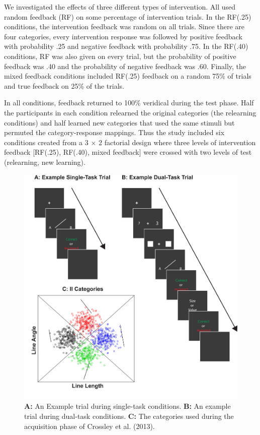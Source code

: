 \documentclass[apacite,draftfirst,man]{apa6}
\begin{document}
We investigated the effects of three different types of intervention. All used
random feedback (RF) on some percentage of intervention trials. In the RF(.25)
conditions, the intervention feedback was random on all trials. Since there are
four categories, every intervention response was followed by positive feedback
with probability .25 and negative feedback with probability .75. In the RF(.40)
conditions, RF was also given on every trial, but the probability of positive
feedback was .40 and the probability of negative feedback was .60. Finally, the
mixed feedback conditions included RF(.25) feedback on a random 75\% of trials
and true feedback on 25\% of the trials.

In all conditions, feedback returned to 100\% veridical during the test phase.
Half the participants in each condition relearned the original categories (the
relearning conditions) and half learned new categories that used the same
stimuli but permuted the category-response mappings. Thus the study included six
conditions created from a 3 $\times$ 2 factorial design where three levels of
intervention feedback [RF(.25), RF(.40), mixed feedback] were crossed with two
levels of test (relearning, new learning).

\begin{figure}[t] \centering
  \includegraphics[width=1.0\textwidth]{../figures/fig_trials.pdf}
  \caption{ \textbf{A:} An Example trial during single-task conditions.
    \textbf{B:} An example trial during dual-task conditions. \textbf{C:} The
    categories used during the acquisition phase of Crossley et al. (2013). }
  \label{fig:test_cats}
\end{figure}
\end{document}
